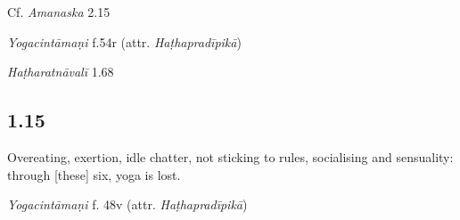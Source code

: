 \begin{ekdosis}
\begin{sources}[hp01_014]
Cf. \emph{Amanaska} 2.15

\begin{versinnote}
\end{versinnote}

\end{sources}

\begin{testimonia}[hp01_014]
\emph{Yogacintāmaṇi} f.54r (attr. \emph{Haṭhapradīpikā})

\begin{versinnote}
\end{versinnote}

\emph{Haṭharatnāvalī} 1.68

\begin{versinnote}
\end{versinnote}

\end{testimonia}


\subsection*{1.15}
\begin{translation}[hp01_015]
Overeating, exertion, idle chatter, not sticking to rules, socialising and sensuality: through [these] six, yoga is lost.
\end{translation}

\begin{testimonia}[hp01_015]
\emph{Yogacintāmaṇi} f. 48v (attr. \emph{Haṭhapradīpikā})

\begin{versinnote}
\end{versinnote}


\end{testimonia}
\end{ekdosis}

